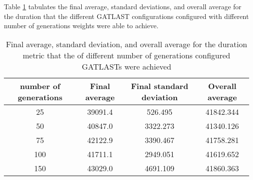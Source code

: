 Table \ref{tab:HP:GA:numGenerations:duration} tabulates the final average, standard deviations, and overall average for the duration that the different GATLAST configurations configured with different number of generations weights were able to achieve.
\begin{table}[tbh!]
\centering
\begin{adjustbox}{trim=0cm 0cm 0cm 0cm, clip=true}
\begin{tabular}{|c|c|c|c|}
\hline
number of generations & Final average & Final standard deviation & Overall average\\
\hline
25 & 39091.4 & 526.495 & 41842.344\\\hline
50 & 40847.0 & 3322.273 & 41340.126\\\hline
75 & 42122.9 & 3390.467 & 41758.281\\\hline
100 & 41711.1 & 2949.051 & 41619.652\\\hline
150 & 43029.0 & 4691.109 & 41860.363\\\hline
\end{tabular}
\end{adjustbox}
\caption{Final average, standard deviation, and overall average for the duration metric that the of different number of generations configured GATLASTs were achieved}
\label{tab:HP:GA:numGenerations:duration}
\end{table}